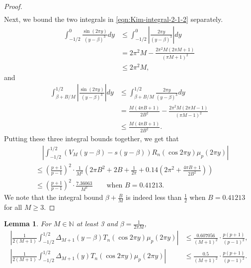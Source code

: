 \documentclass[11pt,letterpaper,reqno]{amsart}
\newtheorem{lemma}[theorem]{Lemma}
\theoremstyle{definition}
\numberwithin{equation}{section}
\numberwithin{figure}{section}
\numberwithin{table}{section}
\begin{document}
\begin{proof}
\begin{align}
\end{align}
Next, we bound the two integrals in \eqref{eqn:Kim-integral-2-1-2} separately.
\begin{align*}
    \int_{-1/2}^{0}
  \frac{\sin(2\pi y)}{(y - \beta)^3}   dy &\leq \int_{-1/2}^{0}
 \left| \frac{2\pi y}{(y - \beta)^3}  \right| dy\\
 &= 2\pi^2M - \frac{2\pi^2 M (2\pi M + 1)}{(\pi M + 1)^2}\\
 &\leq 2\pi^2M,
\end{align*}
and
\begin{align}
    \int_{\beta + B/M}^{1/2}
 \left|\frac{\sin(2\pi y)}{(y - \beta)^3} \right| dy &\leq \int_{\beta + B/M}^{1/2}
 \frac{2\pi y}{(y - \beta)^3}  dy\\
 &= \frac{M(4\pi B + 1)}{2B^2} - \frac{2\pi^2 M(2\pi M - 1)}{(\pi M - 1)^2}\\
 &\leq \frac{M(4\pi B + 1)}{2B^2}.
\end{align}
Putting these three integral bounds together, we get that
\begin{align}
    &\quad \left| \int_{-1/2}^{1/2}
 \left( V_M(y - \beta ) - s(y - \beta) \right) R_n ( \cos 2 \pi y ) \mu_p(2\pi y) \right|\\
 &\leq \left( \frac{p + 1}{p - 1} \right)^2 \cdot \frac{1}{M^2}  \left( 2\pi B^2 + 2B + \frac{1}{2\pi}   +  0.14\left(  2\pi^2 + \frac{4\pi B + 1}{2B^2} \right) \right)\\
 &\leq \left( \frac{p + 1}{p - 1} \right)^2 \cdot \frac{7.36063}{M^2} \qquad \text{when $B = 0.41213.$}
\end{align}
We note that the integral bound $\beta + \frac{B}{M}$ is indeed less than $\frac{1}{2}$ when $B = 0.41213$ for all $M \geq 3.$ 
\end{proof}

\begin{lemma}\label{lem:obvious-fejer-fourier-integral}
    For $M \in \mathbb{N}$ at least 3 and $\beta = \frac{1}{2\pi M}$,
    \begin{align}
        \left| \frac{1}{2(M + 1)} \int_{-1/2}^{1/2} \Delta_{M + 1}(y - \beta) T_n(\cos 2\pi y) \mu_p(2\pi y) \right| &\leq \frac{0.607056}{(M + 1)^2} \cdot \frac{p(p + 1)}{(p - 1)^2},\\
        \left| \frac{1}{2(M + 1)} \int_{-1/2}^{1/2} \Delta_{M + 1}(y) T_n(\cos 2\pi y) \mu_p(2\pi y) \right| &\leq \frac{0.5}{(M + 1)^2} \cdot \frac{p(p + 1)}{(p - 1)^2}.
    \end{align}
\end{lemma}
\end{document}
